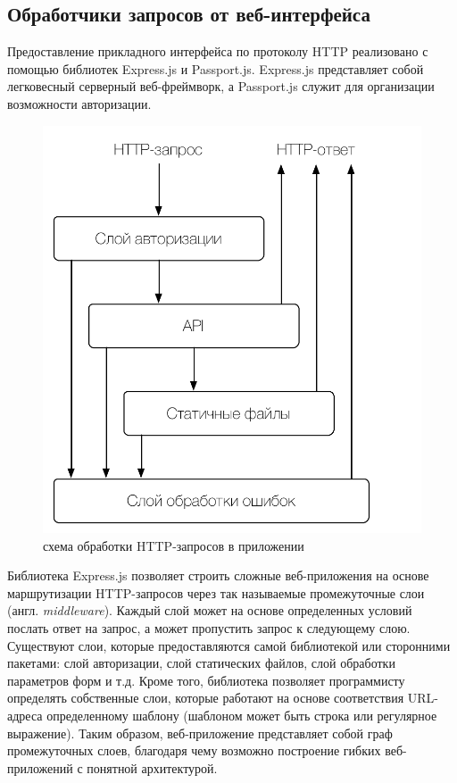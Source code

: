 \documentclass[a4paper,14pt,href,draft]{article}
\begin{document}
\subsection{Обработчики запросов от веб-интерфейса}
Предоставление прикладного интерфейса по протоколу HTTP реализовано с помощью библиотек Express.js\cite{ExpressJS} и
Passport.js\cite{PassportJS}. Express.js представляет собой легковесный серверный веб-фреймворк, а Passport.js служит
для организации возможности авторизации.

\begin{figure}[htbp]
\begin{center}
  \includegraphics[scale=0.8]{http-routing.pdf}
    \caption{схема обработки HTTP-запросов в приложении}
    \label{fig:HttpRouting}
\end{center}
\end{figure}

Библиотека Express.js позволяет строить сложные веб-приложения на основе маршрутизации HTTP-запросов через так называемые
промежуточные слои (англ. \textit{middleware}). Каждый слой может на основе определенных условий послать ответ на запрос,
а может пропустить запрос к следующему слою. Существуют слои, которые предоставляются самой библиотекой или
сторонними пакетами: слой авторизации, слой статических файлов, слой обработки параметров форм и т.д. Кроме того,
библиотека позволяет программисту определять собственные слои, которые работают на основе соответствия URL-адреса определенному
шаблону (шаблоном может быть строка или регулярное выражение). Таким образом, веб-приложение представляет собой граф
промежуточных слоев, благодаря чему возможно построение гибких веб-приложений с понятной архитектурой.
\end{document}
